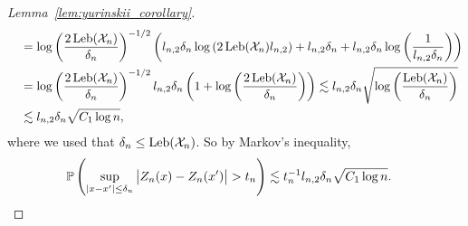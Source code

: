 \begin{proof}[Lemma~\ref{lem:yurinskii_corollary}]
\begin{align*}
    &\quad=
    \log \left(\frac{2\Leb(\cX_n)}{\delta_n} \right)^{-1/2}
    \left(
      l_{n,2} \delta_n \log \left( 2 \Leb(\cX_n) l_{n,2} \right)
      + l_{n,2} \delta_n
      + l_{n,2} \delta_n \log \left( \frac{1}{l_{n,2} \delta_n} \right)
    \right) \\
    &\quad=
    \log \left(\frac{2\Leb(\cX_n)}{\delta_n} \right)^{-1/2}
    l_{n,2} \delta_n
    \left(
      1 +
      \log \left( \frac{2\Leb(\cX_n)}{\delta_n} \right)
    \right)
    \lesssim
    l_{n,2} \delta_n
    \sqrt{\log \left( \frac{\Leb(\cX_n)}{\delta_n} \right)} \\
    &\quad\lesssim
    l_{n,2} \delta_n
    \sqrt{C_1 \log n},
  \end{align*}
  where we used that $\delta_n \leq \Leb(\cX_n)$.
  So by Markov's inequality,
  \begin{align*}
    \P\left(
      \sup_{|x - x'| \leq \delta_n}
      \big|
      Z_n(x) - Z_n(x')
      \big|
      > t_n
    \right)
    &\lesssim
    t_n^{-1}
    l_{n,2} \delta_n
    \sqrt{C_1 \log n}.
  \end{align*}



\end{proof}
